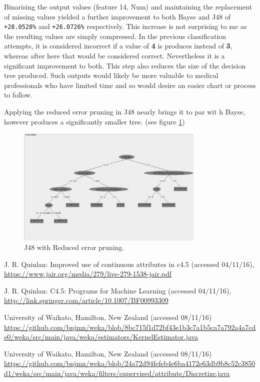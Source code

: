 \documentclass[10pt]{article}
\begin{document}
    Binarising the output values (feature 14, Num) and maintaining the replacement of missing values yielded a further improvement to both Bayse and J48 of \texttt{+28.0528\%} and \texttt{+26.0726\%} respectively. This increase is not surprising to me as the resulting values are simply compressed. In the previous classification attempts, it is considered incorrect if a value of \textbf{4} is produces instead of \textbf{3}, whereas after here that would be considered correct. Nevertheless it is a significant improvement to both. This step also reduces the size of the decision tree produced. Such outputs would likely be more valuable to medical professionals who have limited time and so would desire an easier chart or process to follow.

    Applying the reduced error pruning in J48 nearly brings it to par wit h Bayse, however produces a significantly smaller tree. (see figure \ref{fig:j48ReducedErrorPruning})

    \begin{figure}
      \centering
      \includegraphics[width=0.8\textwidth]{./j48-pruned-tree.png}
      \caption{J48 with Reduced error pruning.}
      \label{fig:j48ReducedErrorPruning}
    \end{figure}

  \begin{thebibliography}{9}
        J. R. Quinlan: Improved use of continuous attributes in c4.5 (accessed 04/11/16),\\
        \url{https://www.jair.org/media/279/live-279-1538-jair.pdf}

        J. R. Quinlan: C4.5: Programs for Machine Learning (accessed 04/11/16),\\
        \url{http://link.springer.com/article/10.1007/BF00993309}

        University of Waikato, Hamilton, New Zealand (accessed 08/11/16)
        \url{https://github.com/bnjmn/weka/blob/8bc715f1d72bf43e1b3c7a1b5ca7a792a4a7cde0/weka/src/main/java/weka/estimators/KernelEstimator.java}

        University of Waikato, Hamilton, New Zealand (accessed 08/11/16)
        \url{https://github.com/bnjmn/weka/blob/24a72d94fefeb4e6ba4172e63db9b8c52c3850d1/weka/src/main/java/weka/filters/supervised/attribute/Discretize.java}
  \end{thebibliography}
\end{document}
